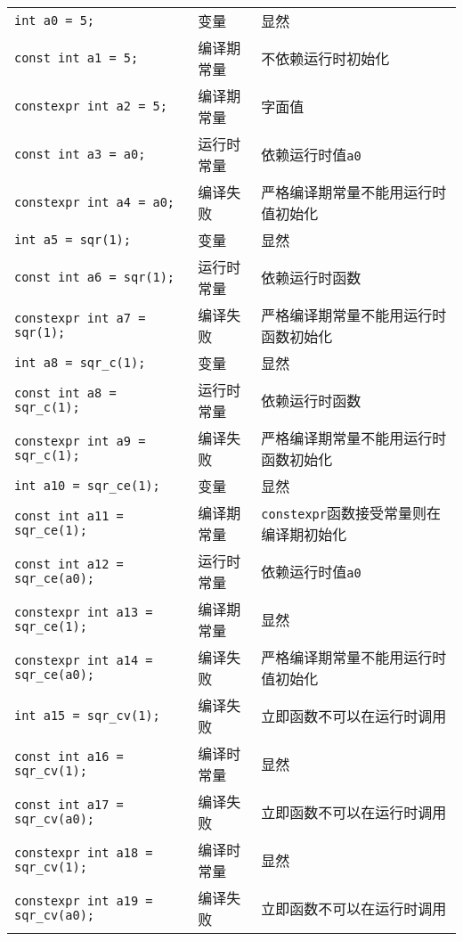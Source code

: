 \begin{tip}
\begin{small}
\begin{longtable}[c]{l|ll}
  \texttt{int a0 = 5;} & 变量 & 显然 \\
  \rowcolor{blue!15}\texttt{const int a1 = 5;} & 编译期常量 & 不依赖运行时初始化 \\
  \texttt{constexpr int a2 = 5;} & 编译期常量 & 字面值 \\
  \texttt{const int a3 = a0;} & 运行时常量 & 依赖运行时值\texttt{a0} \\
  \rowcolor{red!15}\texttt{constexpr int a4 = a0;} & 编译失败 & 严格编译期常量不能用运行时值初始化 \\
  \texttt{int a5 = sqr(1);} & 变量 & 显然 \\
  \texttt{const int a6 = sqr(1);} & 运行时常量 & 依赖运行时函数 \\
  \rowcolor{red!15}\texttt{constexpr int a7 = sqr(1);} & 编译失败 & 严格编译期常量不能用运行时函数初始化 \\
  \texttt{int a8 = sqr\_c(1);} & 变量 & 显然 \\
  \texttt{const int a8 = sqr\_c(1);} & 运行时常量 & 依赖运行时函数 \\
  \rowcolor{red!15}\texttt{constexpr int a9 = sqr\_c(1);} & 编译失败 & 严格编译期常量不能用运行时函数初始化 \\
  \texttt{int a10 = sqr\_ce(1);} & 变量 & 显然 \\
  \rowcolor{blue!15}\texttt{const int a11 = sqr\_ce(1);} & 编译期常量 & \texttt{constexpr}函数接受常量则在编译期初始化 \\
  \texttt{const int a12 = sqr\_ce(a0);} & 运行时常量 & 依赖运行时值\texttt{a0} \\
  \texttt{constexpr int a13 = sqr\_ce(1);} & 编译期常量 & 显然 \\
  \rowcolor{red!15}\texttt{constexpr int a14 = sqr\_ce(a0);} & 编译失败 & 严格编译期常量不能用运行时值初始化 \\
  \rowcolor{red!15}\texttt{int a15 = sqr\_cv(1);} & 编译失败 & 立即函数不可以在运行时调用 \\
  \rowcolor{blue!15}\texttt{const int a16 = sqr\_cv(1);} & 编译时常量 & 显然 \\
  \rowcolor{red!15}\texttt{const int a17 = sqr\_cv(a0);} & 编译失败 & 立即函数不可以在运行时调用 \\
  \texttt{constexpr int a18 = sqr\_cv(1);} & 编译时常量 & 显然 \\
  \rowcolor{red!15}\texttt{constexpr int a19 = sqr\_cv(a0);} & 编译失败 & 立即函数不可以在运行时调用 \\
\end{longtable}
\end{small}
\end{tip}

